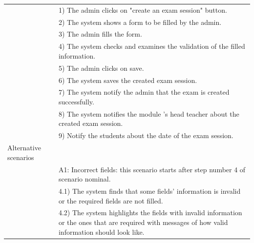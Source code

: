\documentclass[]{uc2pfecaneva}
\begin{document}
\begin{table}[t]
\begin{tabularx}{\textwidth}{|l|X|}
		& 1) The admin clicks on "create an exam session" button.                                                                                                           \\
		& 2) The system shows a form to be filled by the admin.                                                                                                             \\
		& 3) The admin fills the form.                                                                                                                                      \\
		& 4) The system checks and examines the validation of the filled information.                                                                                       \\
		& 5) The admin clicks on save.                                                                                                                                      \\
		& 6) The system saves the created exam session.                                                                                                                     \\
		& 7) The system notify the admin that the exam is created successfully.                                                                                             \\
		& 8) The system notifies the module 's head teacher about the created exam session.                                                                                 \\
		& 9) Notify the students about the date of the exam session.                                                                                                        \\ \hline
		Alternative scenarios &                                                                                                                                                                   \\
		& A1: Incorrect fields: this scenario starts after step number 4 of scenario nominal.                                                                               \\
		& \hspace{4mm}4.1) The system finds that some fields' information is invalid or the required fields are not filled.                                                 \\
		& \hspace{4mm}4.2) The system highlights the fields with invalid information or the ones that are required with messages of how valid information should look like. \\

\end{tabularx}
\end{table}
\end{document}
